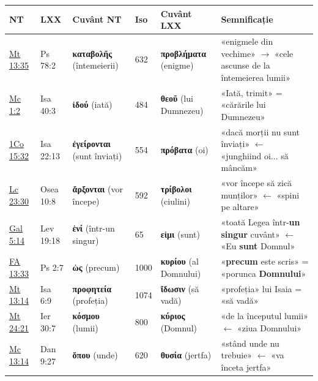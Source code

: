 \documentclass[12pt,a4paper,twoside,openany]{book}
\begin{document}
\begin{center}
\footnotesize
\begin{tabularx}{\textwidth}{L{1.5cm}L{1.5cm}L{2.6cm}C{0.7cm}L{2.6cm}X}
\toprule
{}
\textbf{NT} & \textbf{LXX} & \textbf{Cuvânt NT} & \textbf{Iso} & \textbf{Cuvânt LXX} & \textbf{Semnificație} \\
\midrule
\href{https://bibliaortodoxa.ro/carte.php?id=55\&cap=13\#35}{Mt 13:35} & Ps 78:2 & \textbf{καταβολῆς} (întemeierii) & 632 & \textbf{προβλήματα} (enigme) & «enigmele din vechime» $\to$ «cele ascunse de la întemeierea lumii» \\
\href{https://bibliaortodoxa.ro/carte.php?id=53\&cap=1\#2}{Mc 1:2} & Isa 40:3 & \textbf{ἰδού} (iată) & 484 & \textbf{θεοῦ} (lui Dumnezeu) & «Iată, trimit» = «cărările lui Dumnezeu» \\
\href{https://bibliaortodoxa.ro/carte.php?id=54\&cap=15\#32}{1Co 15:32} & Isa 22:13 & \textbf{ἐγείρονται} (sunt înviați) & 554 & \textbf{πρόβατα} (oi) & «dacă morții nu sunt înviați» $\leftarrow$ «junghiind oi... să mâncăm» \\
\href{https://bibliaortodoxa.ro/carte.php?id=48\&cap=23\#30}{Lc 23:30} & Osea 10:8 & \textbf{ἄρξονται} (vor începe) & 592 & \textbf{τρίβολοι} (ciulini) & «vor începe să zică munților» $\leftarrow$ «spini pe altare» \\
\href{https://bibliaortodoxa.ro/carte.php?id=58\&cap=5\#14}{Gal 5:14} & Lev 19:18 & \textbf{ἑνί} (într-un singur) & 65 & \textbf{εἰμι} (sunt) & «toată Legea într-\textbf{un singur} cuvânt» $\leftarrow$ «Eu \textbf{sunt} Domnul» \\
\href{https://bibliaortodoxa.ro/carte.php?id=51\&cap=13\#33}{FA 13:33} & Ps 2:7 & \textbf{ὡς} (precum) & 1000 & \textbf{κυρίου} (al Domnului) & «\textbf{precum} este scris» = «porunca \textbf{Domnului}» \\
\href{https://bibliaortodoxa.ro/carte.php?id=55\&cap=13\#14}{Mt 13:14} & Isa 6:9 & \textbf{προφητεία} (profeția) & 1074 & \textbf{ἴδωσιν} (să vadă) & «profeția» lui Isaia = «să vadă» \\
\href{https://bibliaortodoxa.ro/carte.php?id=55\&cap=24\#21}{Mt 24:21} & Ier 30:7 & \textbf{κόσμου} (lumii) & 800 & \textbf{κύριος} (Domnul) & «de la începutul lumii» $\leftarrow$ «ziua Domnului» \\
\href{https://bibliaortodoxa.ro/carte.php?id=53\&cap=13\#14}{Mc 13:14} & Dan 9:27 & \textbf{ὅπου} (unde) & 620 & \textbf{θυσία} (jertfa) & «stând unde nu trebuie» $\leftarrow$ «va înceta jertfa» \\

\end{tabularx}
\end{center}
\end{document}
